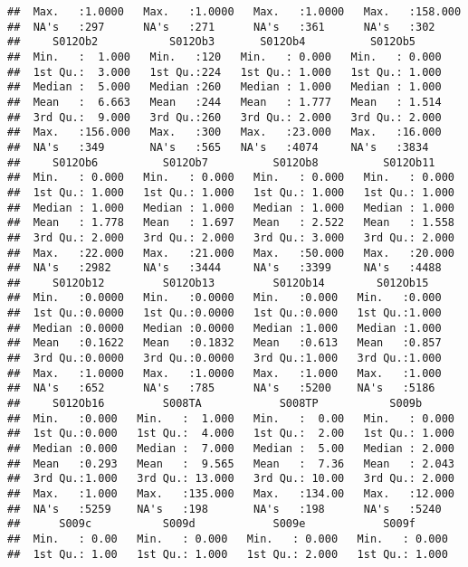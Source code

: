 \documentclass[
]{article}
\begin{document}
\begin{verbatim}
##  Max.   :1.0000   Max.   :1.0000   Max.   :1.0000   Max.   :158.000  
##  NA's   :297      NA's   :271      NA's   :361      NA's   :302      
##     S012Ob2           S012Ob3       S012Ob4          S012Ob5      
##  Min.   :  1.000   Min.   :120   Min.   : 0.000   Min.   : 0.000  
##  1st Qu.:  3.000   1st Qu.:224   1st Qu.: 1.000   1st Qu.: 1.000  
##  Median :  5.000   Median :260   Median : 1.000   Median : 1.000  
##  Mean   :  6.663   Mean   :244   Mean   : 1.777   Mean   : 1.514  
##  3rd Qu.:  9.000   3rd Qu.:260   3rd Qu.: 2.000   3rd Qu.: 2.000  
##  Max.   :156.000   Max.   :300   Max.   :23.000   Max.   :16.000  
##  NA's   :349       NA's   :565   NA's   :4074     NA's   :3834    
##     S012Ob6          S012Ob7          S012Ob8          S012Ob11     
##  Min.   : 0.000   Min.   : 0.000   Min.   : 0.000   Min.   : 0.000  
##  1st Qu.: 1.000   1st Qu.: 1.000   1st Qu.: 1.000   1st Qu.: 1.000  
##  Median : 1.000   Median : 1.000   Median : 1.000   Median : 1.000  
##  Mean   : 1.778   Mean   : 1.697   Mean   : 2.522   Mean   : 1.558  
##  3rd Qu.: 2.000   3rd Qu.: 2.000   3rd Qu.: 3.000   3rd Qu.: 2.000  
##  Max.   :22.000   Max.   :21.000   Max.   :50.000   Max.   :20.000  
##  NA's   :2982     NA's   :3444     NA's   :3399     NA's   :4488    
##     S012Ob12         S012Ob13         S012Ob14        S012Ob15    
##  Min.   :0.0000   Min.   :0.0000   Min.   :0.000   Min.   :0.000  
##  1st Qu.:0.0000   1st Qu.:0.0000   1st Qu.:0.000   1st Qu.:1.000  
##  Median :0.0000   Median :0.0000   Median :1.000   Median :1.000  
##  Mean   :0.1622   Mean   :0.1832   Mean   :0.613   Mean   :0.857  
##  3rd Qu.:0.0000   3rd Qu.:0.0000   3rd Qu.:1.000   3rd Qu.:1.000  
##  Max.   :1.0000   Max.   :1.0000   Max.   :1.000   Max.   :1.000  
##  NA's   :652      NA's   :785      NA's   :5200    NA's   :5186   
##     S012Ob16         S008TA            S008TP           S009b       
##  Min.   :0.000   Min.   :  1.000   Min.   :  0.00   Min.   : 0.000  
##  1st Qu.:0.000   1st Qu.:  4.000   1st Qu.:  2.00   1st Qu.: 1.000  
##  Median :0.000   Median :  7.000   Median :  5.00   Median : 2.000  
##  Mean   :0.293   Mean   :  9.565   Mean   :  7.36   Mean   : 2.043  
##  3rd Qu.:1.000   3rd Qu.: 13.000   3rd Qu.: 10.00   3rd Qu.: 2.000  
##  Max.   :1.000   Max.   :135.000   Max.   :134.00   Max.   :12.000  
##  NA's   :5259    NA's   :198       NA's   :198      NA's   :5240    
##      S009c           S009d            S009e            S009f       
##  Min.   : 0.00   Min.   : 0.000   Min.   : 0.000   Min.   : 0.000  
##  1st Qu.: 1.00   1st Qu.: 1.000   1st Qu.: 2.000   1st Qu.: 1.000  

\end{verbatim}
\end{document}
